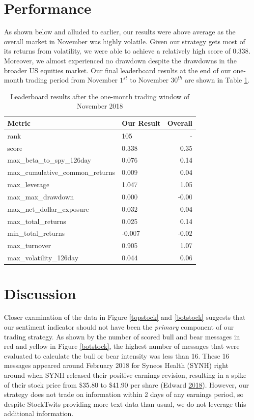 \documentclass[11,]{article}
\begin{document}
\hypertarget{performance}{%
\section{Performance}\label{performance}}

As shown below and alluded to earlier, our results were above average as
the overall market in November was highly volatile. Given our strategy
gets most of its returns from volatility, we were able to achieve a
relatively high score of 0.338. Moreover, we almost experienced no
drawdown despite the drawdowns in the broader US equities market. Our
final leaderboard results at the end of our one-month trading period
from November \(1^{st}\) to November \(30^{th}\) are shown in Table
\ref{leader}.

\begin{table}[ht]
\centering
\caption{Leaderboard results after the one-month trading window of November 2018}
\begin{tabular}{llr}
  \hline
 Metric & Our Result & Overall \\ 
  \hline
   rank & 105 & - \\ 
   score & 0.338 & 0.35 \\ 
   max\_beta\_to\_spy\_126day & 0.076 & 0.14 \\ 
   max\_cumulative\_common\_returns & 0.009 & 0.04 \\ 
   max\_leverage & 1.047 & 1.05 \\ 
   max\_max\_drawdown & 0.000 & -0.00 \\ 
   max\_net\_dollar\_exposure & 0.032 & 0.04 \\ 
   max\_total\_returns & 0.025 & 0.14 \\ 
   min\_total\_returns & -0.007 & -0.02 \\ 
   max\_turnover & 0.905 & 1.07 \\ 
   max\_volatility\_126day & 0.044 & 0.06 \\ 
   \hline
\end{tabular}
\label{leader}
\end{table}

\hypertarget{discussion}{%
\section{Discussion}\label{discussion}}

Closer examination of the data in Figure \ref{topstock} and
\ref{botstock} suggests that our sentiment indicator should not have
been the \emph{primary} component of our trading strategy. As shown by
the number of scored bull and bear messages in red and yellow in Figure
\ref{botstock}, the highest number of messages that were evaluated to
calculate the bull or bear intensity was less than 16. These 16 messages
appeared around February 2018 for Syneos Health (SYNH) right around when
SYNH released their positive earnings revision, resulting in a spike of
their stock price from \$35.80 to \$41.90 per share (Edward
\protect\hyperlink{ref-synh}{2018}). However, our strategy does not
trade on information within 2 days of any earnings period, so despite
StockTwits providing more text data than usual, we do not leverage this
additional information.
\end{document}
